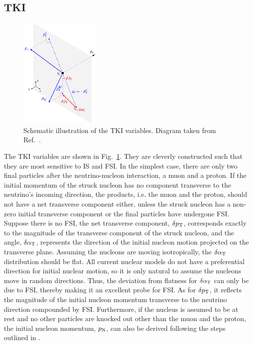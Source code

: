      \subsection{TKI}
        \begin{figure}[!htb] 	
            \centering 		
            \includegraphics[width=0.35\textwidth]{figures/stki.eps}
            \caption{\label{fig:stki} Schematic illustration of the TKI variables. Diagram taken from Ref.~\cite{Lu:2015tcr}.} 
        \end{figure}
    
       The TKI variables are shown in Fig.~\ref{fig:stki}. They are cleverly constructed such that they are most sensitive to IS and FSI. 
       In the simplest case, there are only two final particles after the neutrino-nucleon interaction, a muon and a proton. 
       If the initial momentum of the struck nucleon has no component transverse to the neutrino's incoming direction, the products, i.e. the muon and the proton, should not have a net transverse component either, unless the struck nucleon has a non-zero initial transverse component or the final particles have undergone FSI.
       Suppose there is no FSI, the net transverse component, $\delta p_\textrm{T}$, corresponds exactly to the magnitude of the transverse component of the struck nucleon, and the angle, $\delta\alpha_\textrm{T}$, represents the direction of the initial nucleon motion projected on the transverse plane. 
       Assuming the nucleons are moving isotropically, the $\delta\alpha_\textrm{T}$ distribution should be flat. 
       All current nuclear models do not have a preferential direction for initial nuclear motion, so it is only natural to assume the nucleons move in random directions. 
       Thus, the deviation from flatness for $\delta\alpha_\textrm{T}$ can only be due to FSI, thereby making it an excellent probe for FSI. 
       As for $\delta p_\textrm{T}$, it reflects the magnitude of the initial nucleon momentum transverse to the neutrino direction compounded by FSI. 
       Furthermore, if the nucleus is assumed to be at rest and no other particles are knocked out other than the muon and the proton, the initial nucleon momentum, $p_\textrm{N}$, can also be derived following the steps outlined in \cite{pnpaper}. 
 
